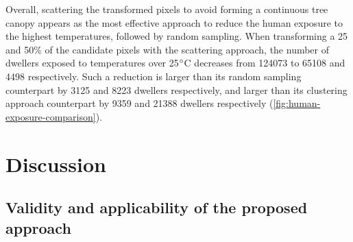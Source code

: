 \documentclass[10pt,letterpaper]{article}
\begin{document}
Overall, scattering the transformed pixels to avoid forming a continuous tree canopy appears as the most effective approach to reduce the human exposure to the highest temperatures, followed by random sampling.
When transforming a 25 and 50\% of the candidate pixels with the scattering approach, the number of dwellers exposed to temperatures over 25$\degree$C decreases from 124073 to 65108 and 4498 respectively. %
Such a reduction is larger than its random sampling counterpart by 3125 and 8223 dwellers respectively, and larger than its clustering approach counterpart by 9359 and 21388 dwellers respectively (\autoref{fig:human-exposure-comparison}).



\section*{Discussion}

\subsection*{Validity and applicability of the proposed approach}
\end{document}
